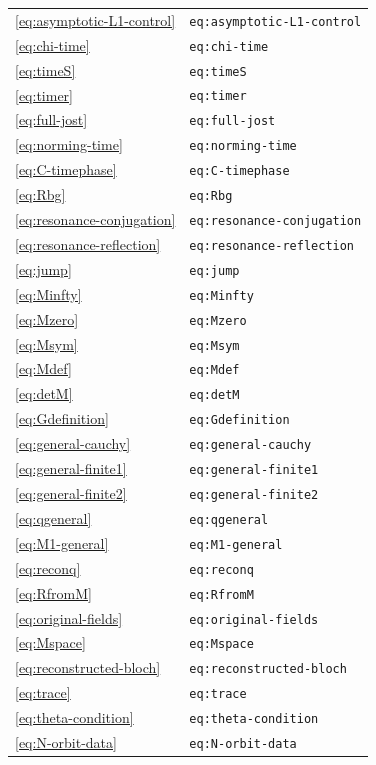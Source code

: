 \begin{longtable}{p{}p{}}
\eqref{eq:asymptotic-L1-control} & \texttt{eq:asymptotic-L1-control}\\
\eqref{eq:chi-time} & \texttt{eq:chi-time}\\
\eqref{eq:timeS} & \texttt{eq:timeS}\\
\eqref{eq:timer} & \texttt{eq:timer}\\
\eqref{eq:full-jost} & \texttt{eq:full-jost}\\
\eqref{eq:norming-time} & \texttt{eq:norming-time}\\
\eqref{eq:C-timephase} & \texttt{eq:C-timephase}\\
\eqref{eq:Rbg} & \texttt{eq:Rbg}\\
\eqref{eq:resonance-conjugation} & \texttt{eq:resonance-conjugation}\\
\eqref{eq:resonance-reflection} & \texttt{eq:resonance-reflection}\\
\eqref{eq:jump} & \texttt{eq:jump}\\
\eqref{eq:Minfty} & \texttt{eq:Minfty}\\
\eqref{eq:Mzero} & \texttt{eq:Mzero}\\
\eqref{eq:Msym} & \texttt{eq:Msym}\\
\eqref{eq:Mdef} & \texttt{eq:Mdef}\\
\eqref{eq:detM} & \texttt{eq:detM}\\
\eqref{eq:Gdefinition} & \texttt{eq:Gdefinition}\\
\eqref{eq:general-cauchy} & \texttt{eq:general-cauchy}\\
\eqref{eq:general-finite1} & \texttt{eq:general-finite1}\\
\eqref{eq:general-finite2} & \texttt{eq:general-finite2}\\
\eqref{eq:qgeneral} & \texttt{eq:qgeneral}\\
\eqref{eq:M1-general} & \texttt{eq:M1-general}\\
\eqref{eq:reconq} & \texttt{eq:reconq}\\
\eqref{eq:RfromM} & \texttt{eq:RfromM}\\
\eqref{eq:original-fields} & \texttt{eq:original-fields}\\
\eqref{eq:Mspace} & \texttt{eq:Mspace}\\
\eqref{eq:reconstructed-bloch} & \texttt{eq:reconstructed-bloch}\\
\eqref{eq:trace} & \texttt{eq:trace}\\
\eqref{eq:theta-condition} & \texttt{eq:theta-condition}\\
\eqref{eq:N-orbit-data} & \texttt{eq:N-orbit-data}\\

\end{longtable}
